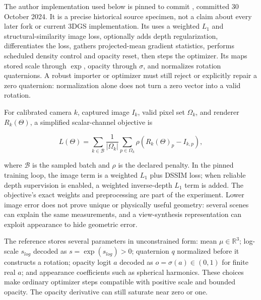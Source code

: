 The author implementation used below is pinned to commit \href{https://github.com/graphdeco-inria/gaussian-splatting/commit/54c035f7834b564019656c3e3fcc3646292f727d}{}, committed 30 October 2024. It is a precise historical source specimen, not a claim about every later fork or current 3DGS implementation. Its \href{https://github.com/graphdeco-inria/gaussian-splatting/blob/54c035f7834b564019656c3e3fcc3646292f727d/train.py\#L126-L186}{} uses a weighted \(L_1\) and structural-similarity image loss, optionally adds depth regularization, differentiates the loss, gathers projected-mean gradient statistics, performs scheduled density control and opacity reset, then steps the optimizer. Its \href{https://github.com/graphdeco-inria/gaussian-splatting/blob/54c035f7834b564019656c3e3fcc3646292f727d/scene/gaussian_model.py\#L39-L47}{} maps stored scale through \(\exp\), opacity through \(\sigma\), and normalizes rotation quaternions. A robust importer or optimizer must still reject or explicitly repair a zero quaternion: normalization alone does not turn a zero vector into a valid rotation.

For calibrated camera \(k\), captured image \(I_k\), valid pixel set \(\Omega_k\), and renderer \(R_k(\Theta)\), a simplified scalar-channel objective is

\[
L(\Theta)=\sum_{k\in\mathcal B}\frac{1}{|\Omega_k|}\sum_{p\in\Omega_k}\rho\left(R_k(\Theta)_p-I_{k,p}\right),
\]

where \(\mathcal B\) is the sampled batch and \(\rho\) is the declared penalty. In the pinned training loop, the image term is a weighted \(L_1\) plus DSSIM loss; when reliable depth supervision is enabled, a weighted inverse-depth \(L_1\) term is added. The objective's exact weights and preprocessing are part of the experiment. Lower image error does not prove unique or physically useful geometry: several scenes can explain the same measurements, and a view-synthesis representation can exploit appearance to hide geometric error.

The reference stores several parameters in unconstrained form: mean \(\mu\in\mathbb R^3\); log-scale \(s_{log}\) decoded as \(s=\exp(s_{log})>0\); quaternion \(q\) normalized before it constructs a rotation; opacity logit \(a\) decoded as \(o=\sigma(a)\in(0,1)\) for finite real \(a\); and appearance coefficients such as spherical harmonics. These choices make ordinary optimizer steps compatible with positive scale and bounded opacity. The opacity derivative can still saturate near zero or one.

